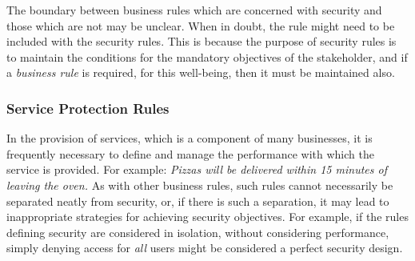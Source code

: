 The boundary between business rules which are concerned with security and those which are not may be unclear. When in doubt, the rule might need to be included with the security rules. This is because the purpose of security rules is to maintain the conditions for the mandatory objectives of the stakeholder, and if a {\em business rule} is required, for this well-being, then it must be maintained also.

\subsubsection{Service Protection Rules}

In the provision of services, which is a component of many businesses, it is frequently necessary to define and manage the performance with which the service is provided. For example: {\em Pizzas will be delivered within 15 minutes of leaving the oven.} As with other business rules, such rules cannot necessarily be separated neatly from security, or, if there is such a separation, it may lead to inappropriate strategies for achieving security objectives. For example, if the rules defining security are considered in isolation, without considering performance, simply denying access for {\em all} users might be considered a perfect security design.

